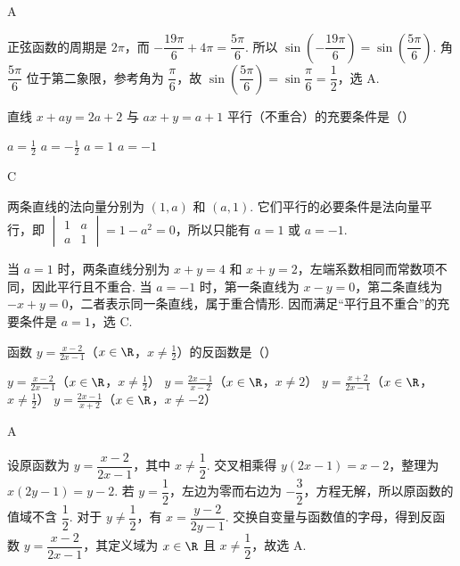 \documentclass[UTF8,a4paper,oneside,11pt]{ctexbook}
\begin{document}
\begin{answer}
A
\end{answer}

\begin{solution}
正弦函数的周期是 \(2\pi\)，而
\(-\dfrac{19\pi}{6}+4\pi=\dfrac{5\pi}{6}\). 所以
\(\sin\left(-\dfrac{19\pi}{6}\right)=\sin\left(\dfrac{5\pi}{6}\right)\). 角 \(\dfrac{5\pi}{6}\) 位于第二象限，参考角为 \(\dfrac\pi6\)，故
\(\sin\left(\dfrac{5\pi}{6}\right)=\sin\dfrac\pi6=\dfrac12\)，选 A.
\end{solution}

\begin{problem}
直线 \(x+ay = 2a+2\) 与 \(ax+y = a+1\) 平行（不重合）的充要条件是（\quad）

\choices
    {\(a = \frac{1}{2}\)}
    {\(a = -\frac{1}{2}\)}
    {\(a = 1\)}
    {\(a = -1\)}
\end{problem}

\begin{answer}
C
\end{answer}

\begin{solution}
两条直线的法向量分别为 \(\left(1,a\right)\) 和 \(\left(a,1\right)\). 它们平行的必要条件是法向量平行，即
\(\begin{vmatrix}1&a\\a&1\end{vmatrix}=1-a^2=0\)，所以只能有 \(a=1\) 或 \(a=-1\).

当 \(a=1\) 时，两条直线分别为 \(x+y=4\) 和 \(x+y=2\)，左端系数相同而常数项不同，因此平行且不重合. 当 \(a=-1\) 时，第一条直线为 \(x-y=0\)，第二条直线为 \(-x+y=0\)，二者表示同一条直线，属于重合情形. 因而满足“平行且不重合”的充要条件是 \(a=1\)，选 C.
\end{solution}

\begin{problem}
函数 \(y = \frac{x-2}{2x-1}\)（\(x \in \R\)，\(x \neq \frac{1}{2}\)）的反函数是（\quad）

\choices
    {\(y = \frac{x-2}{2x-1}\)（\(x \in \R\)，\(x \neq \frac{1}{2}\)）}
    {\(y = \frac{2x-1}{x-2}\)（\(x \in \R\)，\(x \neq 2\)）}
    {\(y = \frac{x+2}{2x-1}\)（\(x \in \R\)，\(x \neq \frac{1}{2}\)）}
    {\(y = \frac{2x-1}{x+2}\)（\(x \in \R\)，\(x \neq -2\)）}
\end{problem}

\begin{answer}
A
\end{answer}

\begin{solution}
设原函数为 \(y=\dfrac{x-2}{2x-1}\)，其中 \(x\ne\dfrac12\). 交叉相乘得
\(y\left(2x-1\right)=x-2\)，整理为 \(x\left(2y-1\right)=y-2\). 若 \(y=\dfrac12\)，左边为零而右边为 \(-\dfrac32\)，方程无解，所以原函数的值域不含 \(\dfrac12\). 对于 \(y\ne\dfrac12\)，有
\(x=\dfrac{y-2}{2y-1}\). 交换自变量与函数值的字母，得到反函数
\(y=\dfrac{x-2}{2x-1}\)，其定义域为 \(x\in\R\) 且 \(x\ne\dfrac12\)，故选 A.
\end{solution}
\end{document}
